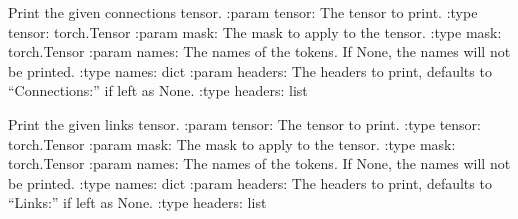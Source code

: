 \documentclass[letterpaper,10pt,english]{sphinxmanual}
\begin{document}
\begin{fulllineitems}
\begin{fulllineitems}
\label{\detokenize{nodes:nodes.nodePrinter.nodePrinter.print_con_tensor}}
\pysigstartsignatures
\pysiglinewithargsret
{}
{\sphinxparamcomma {}\sphinxparamcomma {}\sphinxparamcomma {}}
{}
\pysigstopsignatures
\sphinxAtStartPar
Print the given connections tensor.
:param tensor: The tensor to print.
:type tensor: torch.Tensor
:param mask: The mask to apply to the tensor.
:type mask: torch.Tensor
:param names: The names of the tokens. If None, the names will not be printed.
:type names: dict
:param headers: The headers to print, defaults to “Connections:” if left as None.
:type headers: list

\end{fulllineitems}


\begin{fulllineitems}
\label{\detokenize{nodes:nodes.nodePrinter.nodePrinter.print_links_tensor}}
\pysigstartsignatures
\pysiglinewithargsret
{}
{\sphinxparamcomma {}\sphinxparamcomma {}\sphinxparamcomma {}}
{}
\pysigstopsignatures
\sphinxAtStartPar
Print the given links tensor.
:param tensor: The tensor to print.
:type tensor: torch.Tensor
:param mask: The mask to apply to the tensor.
:type mask: torch.Tensor
:param names: The names of the tokens. If None, the names will not be printed.
:type names: dict
:param headers: The headers to print, defaults to “Links:” if left as None.
:type headers: list

\end{fulllineitems}



\end{fulllineitems}
\end{document}
